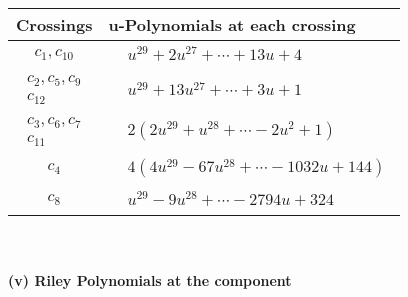 \documentclass[1p]{elsarticle_modified}
\theoremstyle{definition}
\begin{document}
\begin{tabular}{m{50pt}|m{274pt}}
Crossings & \hspace{64pt}u-Polynomials at each crossing \\
\hline $$\begin{aligned}c_{1},c_{10}\end{aligned}$$&$\begin{aligned}
&u^{29}+2 u^{27}+\cdots+13 u+4
\end{aligned}$\\
\hline $$\begin{aligned}c_{2},c_{5},c_{9}\\c_{12}\end{aligned}$$&$\begin{aligned}
&u^{29}+13 u^{27}+\cdots+3 u+1
\end{aligned}$\\
\hline $$\begin{aligned}c_{3},c_{6},c_{7}\\c_{11}\end{aligned}$$&$\begin{aligned}
&2(2 u^{29}+u^{28}+\cdots-2 u^2+1)
\end{aligned}$\\
\hline $$\begin{aligned}c_{4}\end{aligned}$$&$\begin{aligned}
&4(4 u^{29}-67 u^{28}+\cdots-1032 u+144)
\end{aligned}$\\
\hline $$\begin{aligned}c_{8}\end{aligned}$$&$\begin{aligned}
&u^{29}-9 u^{28}+\cdots-2794 u+324
\end{aligned}$\\
\hline
\end{tabular}\\~\\
\newpage\renewcommand{\arraystretch}{1}
\flushleft \textbf{(v) Riley Polynomials at the component}\newline \\
\end{document}
